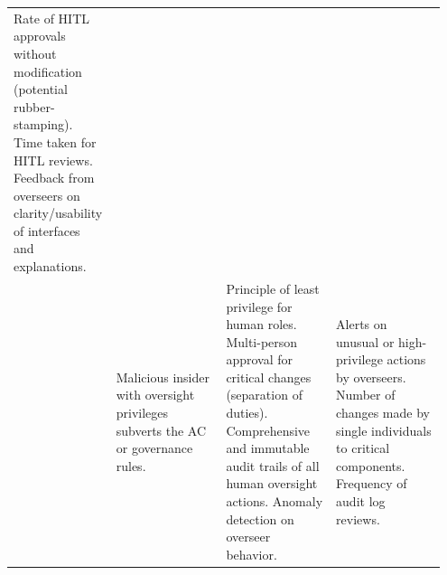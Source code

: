 \documentclass[sigconf,review,anonymous=false]{acmart} %
\begin{document}
\begin{table}[h!]
\begin{tabular}{@{}p{0.2\linewidth}p{0.25\linewidth}p{0.25\linewidth}p{0.25\linewidth}@{}}
    Rate of HITL approvals without modification (potential rubber-stamping). Time taken for HITL reviews. Feedback from overseers on clarity/usability of interfaces and explanations. \\
    \addlinespace
    & Malicious insider with oversight privileges subverts the AC or governance rules. &
    Principle of least privilege for human roles. Multi-person approval for critical changes (separation of duties). Comprehensive and immutable audit trails of all human oversight actions. Anomaly detection on overseer behavior. &
    Alerts on unusual or high-privilege actions by overseers. Number of changes made by single individuals to critical components. Frequency of audit log reviews. \\
    \bottomrule
  \end{tabular}
\end{table}

\balance %
\end{document}
